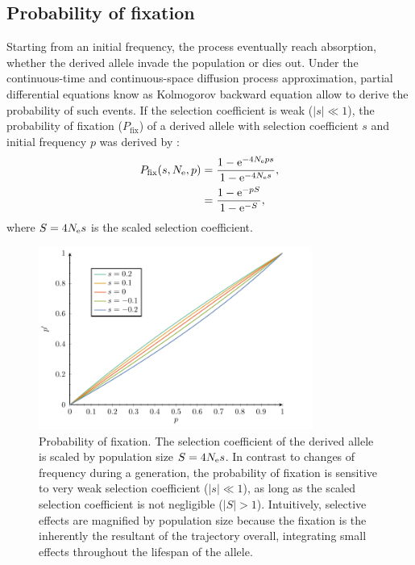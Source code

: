 \subsection{Probability of fixation}
Starting from an initial frequency, the process eventually reach absorption, whether the derived \gls{allele} invade the population or dies out. 
Under the continuous-time and continuous-space diffusion process approximation, partial differential equations know as Kolmogorov backward equation allow to derive the probability of such events. 
If the selection coefficient is weak ($|s| \ll 1$), the probability of fixation ($P_{\mathrm{fix}}$) of a derived \gls{allele} with selection coefficient $s$ and initial frequency $p$ was derived by \citet{Kimura1962}:
\begin{align}
P_{\mathrm{fix}}(s, N_{\textrm{e}}, p) & = \dfrac{1 - \mathrm{e}^{-4 N_{\textrm{e}} p s }}{1 - \mathrm{e}^{-4 N_{\textrm{e}} s}},\\
			     & = \dfrac{1 - \mathrm{e}^{- p S }}{1 - \mathrm{e}^{-S}},
\end{align}
where $S = 4 N_{\textrm{e}} s$ is the scaled selection coefficient.
\begin{figure}[H]
	\begin{center}
		\includegraphics[width=0.8\textwidth, page=3] {figures.pdf}
	\end{center}
	\caption[Probability of fixation]{Probability of fixation. The selection coefficient of the derived \gls{allele} is scaled by population size $S=4 N_{\textrm{e}} s$. In contrast to changes of frequency during a generation, the probability of fixation is sensitive to very weak selection coefficient ($|s| \ll 1$), as long as the scaled selection coefficient is not negligible ($|S| > 1$). Intuitively, selective effects are magnified by population size because the fixation is the inherently the resultant of the trajectory overall, integrating small effects throughout the lifespan of the \gls{allele}. }
\end{figure}

